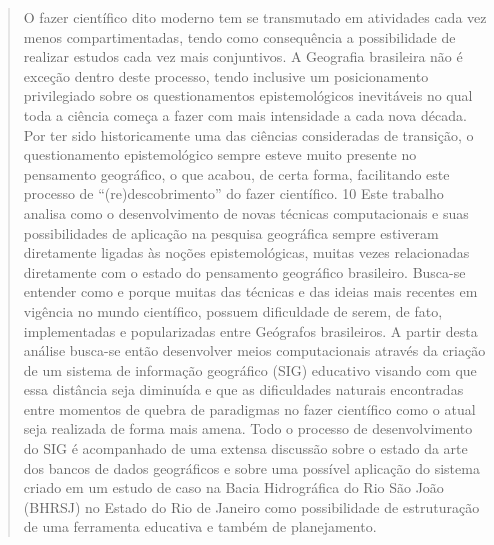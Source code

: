 \documentclass[12pt,a4paper,openany]{book} %
\begin{document}
	\begin{quote}
		O fazer científico\cite{CASTIGLIONE} dito moderno tem se transmutado em atividades cada vez menos compartimentadas, tendo como consequência a possibilidade de realizar estudos cada vez mais conjuntivos. A Geografia brasileira não é exceção dentro deste processo, tendo inclusive um posicionamento privilegiado sobre os questionamentos epistemológicos inevitáveis no qual\cite{DANIELS_etal11} toda a ciência começa a fazer com mais intensidade a cada nova década. Por ter sido historicamente uma das ciências consideradas de transição, o questionamento epistemológico sempre esteve muito presente no pensamento geográfico, o que\cite{CAMARA_etal10} acabou\cite{CESIUM}, de certa forma, facilitando este processo de “(re)descobrimento” do fazer científico.
	10	Este trabalho analisa como o desenvolvimento de novas técnicas computacionais e suas possibilidades de aplicação na pesquisa geográfica sempre estiveram diretamente ligadas às noções epistemológicas, muitas vezes relacionadas diretamente com o estado do pensamento geográfico brasileiro. Busca-se entender como e porque muitas das técnicas e das ideias mais recentes em vigência no mundo científico, possuem dificuldade de serem, de fato, implementadas e popularizadas entre Geógrafos brasileiros. 
		A partir desta análise busca-se então desenvolver meios computacionais através da criação de um sistema de informação geográfico (SIG) educativo visando com que essa distância seja diminuída e que as dificuldades naturais encontradas entre momentos de quebra de paradigmas no fazer científico como o atual seja realizada de forma mais amena. 
		Todo o processo de desenvolvimento do SIG é acompanhado de uma extensa discussão sobre o estado da arte dos bancos de dados geográficos e sobre uma possível aplicação do sistema criado em um estudo de caso na Bacia Hidrográfica do Rio São João (BHRSJ) no Estado do Rio de Janeiro como possibilidade de estruturação de uma ferramenta educativa e também de planejamento.
	\end{quote}
\end{document}
